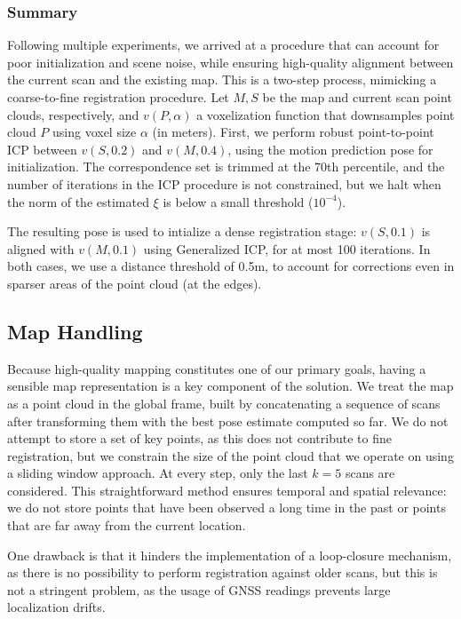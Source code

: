 \subsubsection{Summary}

Following multiple experiments, we arrived at a procedure that can account for poor initialization and scene noise, while ensuring high-quality alignment between the current scan and the existing map. This is a two-step process, mimicking a coarse-to-fine registration procedure. Let $M, S$ be the map and current scan point clouds, respectively, and $v(P, \alpha)$ a voxelization function that downsamples point cloud $P$ using voxel size $\alpha$ (in meters). First, we perform robust point-to-point ICP between $v(S, 0.2)$ and $v(M, 0.4)$, using the motion prediction pose for initialization. The correspondence set is trimmed at the 70th percentile, and the number of iterations in the ICP procedure is not constrained, but we halt when the norm of the estimated $\xi$ is below a small threshold ($10^{-4}$).

The resulting pose is used to intialize a dense registration stage: $v(S, 0.1)$ is aligned with $v(M, 0.1)$ using Generalized ICP, for at most 100 iterations. In both cases, we use a distance threshold of 0.5m, to account for corrections even in sparser areas of the point cloud (\eg at the edges).

\subsection{Map Handling}

Because high-quality mapping constitutes one of our primary goals, having a sensible map representation is a key component of the solution. We treat the map as a point cloud in the global frame, built by concatenating a sequence of scans after transforming them with the best pose estimate computed so far. We do not attempt to store a set of key points, as this does not contribute to fine registration, but we constrain the size of the point cloud that we operate on using a sliding window approach. At every step, only the last $k=5$ scans are considered. This straightforward method ensures temporal and spatial relevance: we do not store points that have been observed a long time in the past or points that are far away from the current location.

One drawback is that it hinders the implementation of a loop-closure mechanism, as there is no possibility to perform registration against older scans, but this is not a stringent problem, as the usage of GNSS readings prevents large localization drifts.

